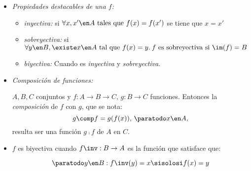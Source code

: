 \begin{itemize}[label={\tiny{}}]
\begin{itemize}[label=\tiny{}]
\begin{itemize}[label=\tiny{}]
                  \item \textit{Propiedades destacables de una $f$:}
                        \begin{itemize}[label=\tiny{}]
                          \item \textit{inyectiva:} si $\forall x, x' \en A \text{ tales que } f(x) = f(x')$ se tiene que $ x = x'$
                          \item \textit{sobreyectiva:} si $\forall y \en B, \existe x \en A \text{ tal que } f(x) = y.\: f\text{ es sobreyectiva si } \im(f) = B$
                          \item \textit{biyectiva:} Cuando es \textit{inyectiva} y \textit{sobreyectiva}.
                        \end{itemize}

                  \item \textit{Composición de funciones:}\par
                        $A, B, C$ conjuntos y $f: A \to B \to C,\, g: B \to C$ funciones. Entonces la \textit{composición} de $f$ con $g$, que se nota:
                        $$
                          g \comp f = g(f(x)),\, \paratodo x \en A,
                        $$
                        resulta ser una función $g \comp f$ de $A$ en $C$.

                  \item $f$ es biyectiva cuando $f\inv : B \to A$ es la función que satisface que:\par
                        $$
                          \paratodo y \en B: f\inv(y) = x \sisolosi f(x) = y
                        $$
                \end{itemize}
        \end{itemize}
\end{itemize}
